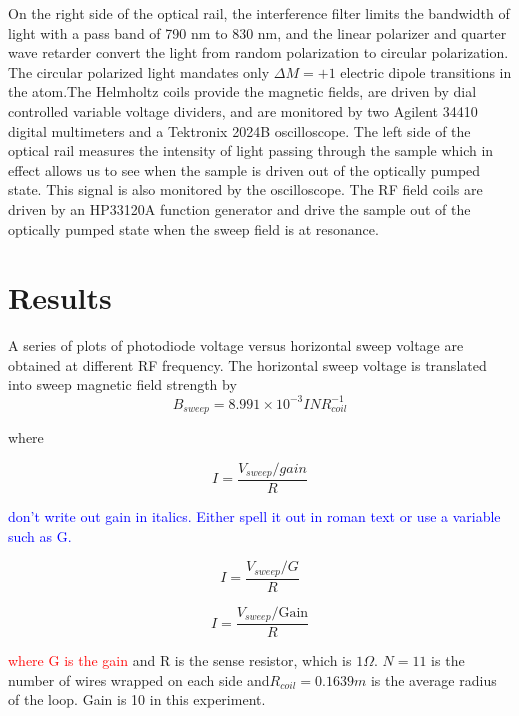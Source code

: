\documentclass[prb,preprint]{revtex4-1}
\begin{document}
On the right side of the optical rail, the interference filter limits the bandwidth of light with a pass band of 790 nm to 830 nm, and the linear polarizer and quarter wave retarder convert the light from random polarization to circular polarization. The circular polarized light mandates only $\Delta M=+1$ electric dipole transitions in the atom.The Helmholtz coils provide the magnetic fields, are driven by dial controlled variable voltage dividers, and are monitored by two Agilent 34410 digital multimeters and a Tektronix 2024B oscilloscope. The left side of the optical rail measures the intensity of light passing through the sample which in effect allows us to see when the sample is driven out of the optically pumped state. This signal is also monitored by the oscilloscope. The RF field coils are driven by an HP33120A function generator and drive the sample out of the optically pumped state when the sweep field is at resonance.


\section{Results}

A series of plots of photodiode voltage versus horizontal sweep voltage are obtained at different RF frequency. The horizontal sweep voltage is translated into sweep magnetic field strength by
\begin{equation}
B_{sweep}=8.991\times10^{-3} I N R_{coil}^{-1}
\label{vtob}
\end{equation}

where

\begin{equation}
I=\frac{V_{sweep}/gain}{R}
\label{vtoi}
\end{equation}

\textcolor{blue}{don't write out gain in italics. Either spell it out in roman text or use a variable such as G.} 



\begin{equation*}
I=\frac{V_{sweep}/G}{R}
\label{vtoi}
\end{equation*}

\begin{equation*}
I=\frac{V_{sweep}/{\textrm{Gain}}}{R}
\label{vtoi}
\end{equation*}


\textcolor{red}{where G is the gain} and R is the sense resistor, which is $1 \Omega$. $N=11$ is the number of wires wrapped on each side and$R_{coil}=0.1639m$ is the average radius of the loop. Gain is 10 in this experiment. 
\end{document}
